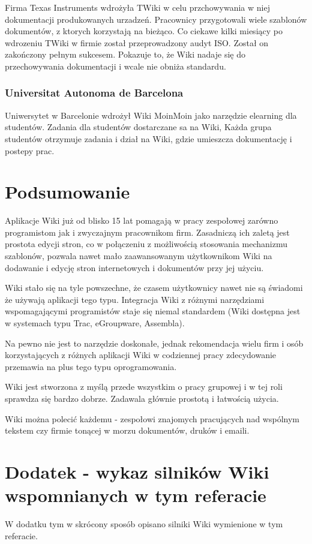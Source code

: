 \documentclass{article}
\begin{document}
Firma Texas Instruments wdrożyła TWiki w celu przchowywania w niej dokumentacji produkowanych urzadzeń. Pracownicy przygotowali wiele szablonów dokumentów, z ktorych korzystają na bieżąco. Co ciekawe kilki miesiący po wdrozeniu TWiki w firmie został przeprowadzony audyt ISO. Został on zakończony pełnym sukcesem. Pokazuje to, że Wiki nadaje się do przechowywania dokumentacji i wcale nie obniża standardu.

\subsubsection{Universitat Autonoma de Barcelona } 

Uniwersytet w Barcelonie wdrożył Wiki MoinMoin jako narzędzie elearning dla studentów.
Zadania dla studentów dostarczane sa na Wiki, Każda grupa studentów otrzymuje zadania i dział na Wiki, gdzie umieszcza dokumentację i postepy prac.

\newpage
\section{Podsumowanie}

Aplikacje Wiki już od blisko 15 lat pomagają w pracy zespołowej zarówno programistom jak i zwyczajnym pracownikom firm. Zasadniczą ich zaletą jest prostota edycji stron, co w połączeniu z możliwością stosowania mechanizmu szablonów, pozwala nawet mało zaawansowanym użytkownikom Wiki na dodawanie i edycję stron internetowych i dokumentów przy jej użyciu.

Wiki stało się na tyle powszechne, że czasem użytkownicy nawet nie są świadomi że używają aplikacji tego typu. Integracja Wiki z różnymi narzędziami wspomagającymi programistów staje się niemal standardem (Wiki dostępna jest w systemach typu Trac, eGroupware, Assembla). 

Na pewno nie jest to narzędzie doskonałe, jednak rekomendacja wielu firm i osób korzystających z różnych aplikacji Wiki w codziennej pracy zdecydowanie przemawia na plus tego typu oprogramowania.

Wiki jest stworzona z myślą przede wszystkim o pracy grupowej i w tej roli sprawdza się bardzo dobrze. Zadawala głównie prostotą i łatwością użycia.

Wiki można polecić każdemu - zespołowi znajomych pracujących nad wspólnym tekstem czy firmie tonącej w morzu dokumentów, druków i emaili. 


\newpage
\section{Dodatek - wykaz silników Wiki wspomnianych w tym referacie}
W dodatku tym w skrócony sposób opisano silniki Wiki wymienione w tym referacie.
\end{document}
